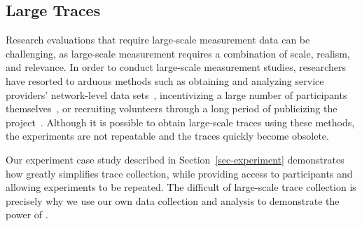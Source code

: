 \subsection{Large Traces}

Research evaluations that require large-scale measurement data can be
challenging, as large-scale measurement requires a combination of scale,
realism, and relevance. In order to conduct large-scale measurement studies,
researchers have resorted to arduous methods such as obtaining and analyzing
service providers' network-level data sets~\cite{xu:imc:2011,
trestian:imc:2009, trestian:ton:2012}, incentivizing a large number of
participants themselves~\cite{falaki:mobisys:2010}, or recruiting volunteers
through a long period of publicizing the project~\cite{shye:micro:2009}.
Although it is possible to obtain large-scale traces using these methods, the
experiments are not repeatable and the traces quickly become obsolete.

Our experiment case study described in Section~\ref{sec-experiment}
demonstrates how \PhoneLab{} greatly simplifies trace collection, while
providing access to participants and allowing experiments to be repeated. The
difficult of large-scale trace collection is precisely why we use our own
data collection and analysis to demonstrate the power of \PhoneLab{}.
